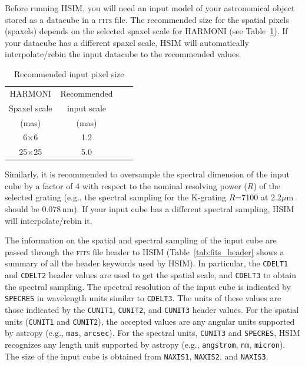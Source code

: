 \documentclass[12pt]{report}
\begin{document}
Before running HSIM, you will need an input model of your astronomical object stored as a datacube in a \textsc{fits} file. The recommended size for the spatial pixels (spaxels) depends on the selected spaxel scale for HARMONI (see Table~\ref{tab:scale}). If your datacube has a different spaxel scale, HSIM will automatically interpolate\slash rebin the input datacube to the recommended values.

\begin{table}[h]
\centering
\caption{Recommended input pixel size}
\label{tab:scale}
\begin{tabular}{cccc}
\hline
HARMONI & Recommended\\
Spaxel scale & input scale\\
(mas) & (mas) \\
\hline
6$\times$6   & 1.2 \\
25$\times$25   & 5.0 \\
\hline
\end{tabular}
\end{table}

Similarly, it is recommended to oversample the spectral dimension of the input cube by a factor of 4 with respect to the nominal resolving power ($R$) of the selected grating (e.g., the spectral sampling for the K-grating $R$=7100 at 2.2$\mu$m should be 0.078\,nm). If your input cube has a different spectral sampling, HSIM will interpolate\slash rebin it. 

The information on the spatial and spectral sampling of the input cube are passed through the \textsc{fits} file header to HSIM (Table~\ref{tab:fits_header} shows a summary of all the header keywords used by HSIM). In particular, the \texttt{CDELT1} and \texttt{CDELT2} header values are used to get the spatial scale, and \texttt{CDELT3} to obtain the spectral sampling. The spectral resolution of the input cube is indicated by \texttt{SPECRES} in wavelength units similar to \texttt{CDELT3}. The units of these values are those indicated by the \texttt{CUNIT1}, \texttt{CUNIT2}, and \texttt{CUNIT3} header values. For the spatial units (\texttt{CUNIT1} and \texttt{CUNIT2}), the accepted values are any angular units supported by astropy (e.g., \texttt{mas}, \texttt{arcsec}). For the spectral units, \texttt{CUNIT3} and \texttt{SPECRES}, HSIM recognizes any length unit supported by astropy (e.g., \texttt{angstrom}, \texttt{nm}, \texttt{micron}). The size of the input cube is obtained from \texttt{NAXIS1}, \texttt{NAXIS2}, and \texttt{NAXIS3}.
\end{document}
